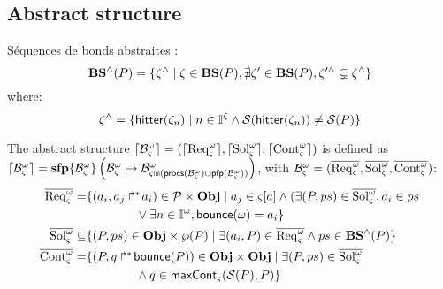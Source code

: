 \subsection{Abstract structure}
Séquences de bonds abstraites :
$$\mathbf{BS}^\wedge(P) = \{ \zeta^\wedge \mid \zeta \in \mathbf{BS}(P), \nexists \zeta' \in \mathbf{BS}(P), \zeta'^\wedge \subsetneq \zeta^\wedge \}$$
where:
$$\zeta^\wedge = \{ \mathsf{hitter}(\zeta_n) \mid n \in \mathbb{I}^{\zeta} \wedge \mathcal{S}(\mathsf{hitter}(\zeta_n)) \neq \mathcal{S}(P) \}$$

The abstract structure $\lceil \mathcal{B}_\varsigma^\omega\rceil=(\lceil \mathrm{Req}^\omega_\varsigma\rceil,\lceil \mathrm{Sol}^\omega_\varsigma\rceil,\lceil \mathrm{Cont}^\omega_\varsigma\rceil)$ is defined as
$
 \lceil \mathcal{B}_\varsigma^\omega\rceil = \mathbf{sfp}\{\mathcal{B}^\omega_\varsigma\}\left(\mathcal{B}^\omega_\varsigma\mapsto\mathcal{B}^\omega_{\varsigma \Cap (\mathsf{procs}(\mathcal{B}^\omega_\varsigma) \cup \mathsf{pfp}(\mathcal{B}^\omega_\varsigma))}\right)
$,
with $\mathcal{B}^\omega_\varsigma=(\overline{\mathrm{Req}^\omega_\varsigma},\overline{\mathrm{Sol}^\omega_\varsigma},\overline{\mathrm{Cont}^\omega_\varsigma})$:
\begin{align*}
\overline{\mathrm{Req}^\omega_\varsigma} = &\{ (a_i,\mbox{${a}_{j}\Rsh^*\!{a}_{i}$}) \in \mathcal{P} \times \mathbf{Obj} \mid a_j \in {\varsigma[a]}
  \wedge (\exists (P,ps) \in \overline{\mathrm{Sol}^\omega_\varsigma}, a_i \in ps \\
& \qquad\qquad
          \vee \exists n \in \mathbb{I}^{\omega}, \mathsf{bounce}(\omega)=a_i\}
\\
\overline{\mathrm{Sol}^\omega_\varsigma} \subseteq & \{ (P,ps) \in \mathbf{Obj} \times \wp(\mathcal{P}) \mid
        \exists (a_i,P)\in \overline{\mathrm{Req}^\omega_\varsigma} \wedge ps \in \mathbf{BS}^\wedge(P)  \}
\\
\overline{\mathrm{Cont}^\omega_\varsigma} = & \{ (P,\mbox{$q\Rsh^*\!\mathsf{bounce}(P)$}) \in \mathbf{Obj} \times \mathbf{Obj} \mid 
        \exists (P,ps)\in \overline{\mathrm{Sol}^\omega_\varsigma} \\
&\qquad\qquad
        \wedge q \in \mathsf{maxCont}_\varsigma(\mathcal{S}(P),P)\}
\end{align*}

\begin{comment}
Voisinage :
\begin{equation*}
\begin{split}
    V: \wp(\PHproc) \times \segm{1}{k} &\rightarrow \wp(\PHh) \\
    (ps; m) &\mapsto \sfp{\PHh^{(m)+}_{cibles}(ps)}{hs}{\PHh^{(m)+)}_{bonds}(\widehat{B}(hs)) \cup hs)}
  \end{split}
\end{equation*}
where:
\begin{equation*}
\begin{split}
    \widehat{B}: \wp(\PHh) &\rightarrow \wp(\PHproc) \\
    hs &\mapsto \{ \PHhitter(h) \mid h \in hs \} \cup \{ \PHtarget(h) \mid h \in hs \}
  \end{split}
\end{equation*}
\begin{equation*}
\begin{split}
    \PHh^{(m)+}_{\mathsf{ref}}: \wp(\PHproc) &\rightarrow \wp(\PHh) \quad,\quad m \in \segm{0}{k} \text{ and } \mathsf{ref} \in \{ \PHhitter, \PHtarget, \PHbounce \} \\
    ps &\mapsto \{ h \in \PHh \mid \mathsf{ref}(h) \in ps \wedge \prio(h) \leq m \}
  \end{split}
\end{equation*}
\end{comment}



